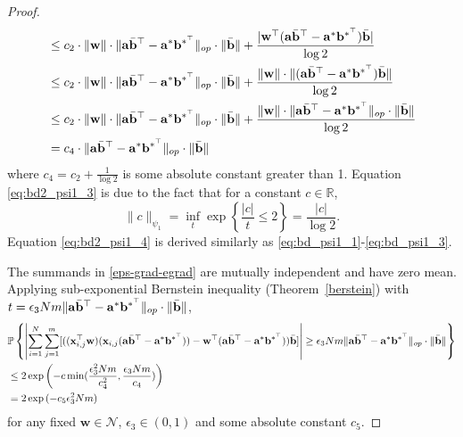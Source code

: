 \documentclass{article}
\theoremstyle{plain}
\theoremstyle{definition}
\theoremstyle{remark}
\begin{document}
\begin{proof}
\begin{align}
    &\leq c_2\cdot \| 
    \mathbf w \|\cdot \lVert \mathbf{a}\Bar{\mathbf{b}}^\top-\mathbf{a}^* \mathbf{b}^{*^\top} \rVert_{op} \cdot \lVert \Bar{\mathbf{b}} \rVert + \frac{| \mathbf{w}^\top(\mathbf{a}\Bar{\mathbf{b}}^\top-\mathbf{a}^* \mathbf{b}^{*^\top}) \Bar{\mathbf{b}}|}{\log 2} \label{eq:bd2_psi1_4}\\
    &\leq c_2\cdot \| 
    \mathbf w \|\cdot \lVert \mathbf{a}\Bar{\mathbf{b}}^\top-\mathbf{a}^* \mathbf{b}^{*^\top} \rVert_{op} \cdot \lVert \Bar{\mathbf{b}} \rVert + \frac{\| \mathbf{w}\|\cdot\|(\mathbf{a}\Bar{\mathbf{b}}^\top-\mathbf{a}^* \mathbf{b}^{*^\top}) \Bar{\mathbf{b}}\|}{\log 2}\label{eq:bd2_psi1_5}\\
    &\leq c_2\cdot \| 
    \mathbf w \|\cdot \lVert \mathbf{a}\Bar{\mathbf{b}}^\top-\mathbf{a}^* \mathbf{b}^{*^\top} \rVert_{op} \cdot \lVert \Bar{\mathbf{b}} \rVert + \frac{\| \mathbf{w}\|\cdot\|\mathbf{a}\Bar{\mathbf{b}}^\top-\mathbf{a}^* \mathbf{b}^{*^\top}\|_{op}\cdot \| \Bar{\mathbf{b}}\|}{\log 2}\label{eq:bd2_psi1_6}\\
    &= c_4 \cdot\lVert \mathbf{a}\Bar{\mathbf{b}}^\top-\mathbf{a}^* \mathbf{b}^{*^\top} \rVert_{op} \cdot \lVert \Bar{\mathbf{b}} \rVert \label{eq:bd2_psi1_7}
\end{align}
where $c_4 = c_2 + \frac{1}{\log 2}$ is some absolute constant greater than 1. Equation \eqref{eq:bd2_psi1_3} is due to the fact that for a constant $c \in\mathbb R$, 
\[
\|c\|_{\psi_1} = \inf_t \exp\left\{\frac{|c|}{t} \le 2\right\} = \frac{|c|}{\log 2}.
\]
Equation \eqref{eq:bd2_psi1_4} is derived similarly as \eqref{eq:bd_psi1_1}-\eqref{eq:bd_psi1_3}.

The summands in \eqref{eps-grad-egrad} are mutually independent and have zero mean. Applying sub-exponential Bernstein inequality (Theorem~\ref{berstein}) with $t=\epsilon_3 Nm\lVert \mathbf{a}\Bar{\mathbf{b}}^\top-\mathbf{a}^* \mathbf{b}^{*^\top} \rVert_{op} \cdot \lVert \Bar{\mathbf{b}} \rVert $,
\begin{align}
    & \mathbb{P} \left\{  \left| \sum_{i=1}^{N}\sum_{j=1}^{m}[((\mathbf{x}_{i,j}^\top\mathbf{w})(\mathbf{x}_{i,j}(\mathbf{a}\Bar{\mathbf{b}}^\top-\mathbf{a}^* \mathbf{b}^{*^\top})) - \mathbf{w}^\top(\mathbf{a}\Bar{\mathbf{b}}^\top-\mathbf{a}^* \mathbf{b}^{*^\top}) )\Bar{\mathbf{b}}] \right| \geq \epsilon_3 Nm \lVert \mathbf{a}\Bar{\mathbf{b}}^\top-\mathbf{a}^* \mathbf{b}^{*^\top} \rVert_{op} \cdot \lVert \Bar{\mathbf{b}} \rVert  \right\} \label{berstein-2}\\
    & \leq 2\exp \left( -c \min (\frac{\epsilon_3^2Nm}{c_4^2}, \frac{\epsilon_3 N m}{c_4})\right) \\
    & = 2\exp{(-c_5\epsilon_3^2 Nm)}
\end{align}
for any fixed $\mathbf w \in \mathcal N$, $\epsilon_3 \in (0,1)$ and some absolute constant $c_5$. 


\end{proof}
\end{document}
